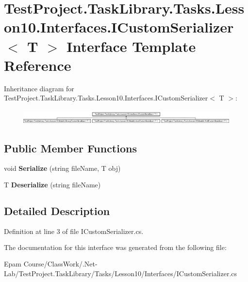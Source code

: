\hypertarget{interface_test_project_1_1_task_library_1_1_tasks_1_1_lesson10_1_1_interfaces_1_1_i_custom_serializer}{}\section{Test\+Project.\+Task\+Library.\+Tasks.\+Lesson10.\+Interfaces.\+I\+Custom\+Serializer$<$ T $>$ Interface Template Reference}
\label{interface_test_project_1_1_task_library_1_1_tasks_1_1_lesson10_1_1_interfaces_1_1_i_custom_serializer}
Inheritance diagram for Test\+Project.\+Task\+Library.\+Tasks.\+Lesson10.\+Interfaces.\+I\+Custom\+Serializer$<$ T $>$\+:\begin{figure}[H]
\begin{center}
\leavevmode
\includegraphics[height=0.811594cm]{interface_test_project_1_1_task_library_1_1_tasks_1_1_lesson10_1_1_interfaces_1_1_i_custom_serializer}
\end{center}
\end{figure}
\subsection*{Public Member Functions}
\begin{DoxyCompactItemize}
\item 
\mbox{\label{interface_test_project_1_1_task_library_1_1_tasks_1_1_lesson10_1_1_interfaces_1_1_i_custom_serializer_a735d5975f46403dc4198231467be713e}} 
void {\bfseries Serialize} (string file\+Name, T obj)
\item 
\mbox{\label{interface_test_project_1_1_task_library_1_1_tasks_1_1_lesson10_1_1_interfaces_1_1_i_custom_serializer_a748dfc52f7a70204085b5d6876258380}} 
T {\bfseries Deserialize} (string file\+Name)
\end{DoxyCompactItemize}


\subsection{Detailed Description}


Definition at line 3 of file I\+Custom\+Serializer.\+cs.



The documentation for this interface was generated from the following file\+:\begin{DoxyCompactItemize}
\item 
Epam Course/\+Class\+Work/.\+Net-\/\+Lab/\+Test\+Project.\+Task\+Library/\+Tasks/\+Lesson10/\+Interfaces/I\+Custom\+Serializer.\+cs\end{DoxyCompactItemize}
